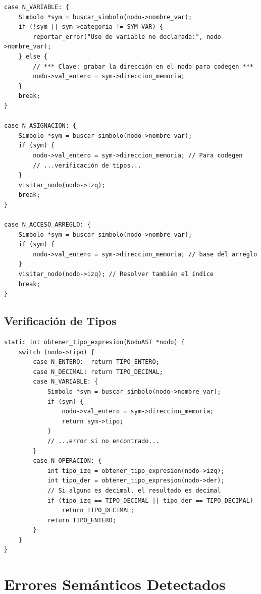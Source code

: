 \begin{lstlisting}[style=cstyle, caption={Anotación de variables en el AST}]
case N_VARIABLE: {
    Simbolo *sym = buscar_simbolo(nodo->nombre_var);
    if (!sym || sym->categoria != SYM_VAR) {
        reportar_error("Uso de variable no declarada:", nodo->nombre_var);
    } else {
        // *** Clave: grabar la dirección en el nodo para codegen ***
        nodo->val_entero = sym->direccion_memoria;
    }
    break;
}

case N_ASIGNACION: {
    Simbolo *sym = buscar_simbolo(nodo->nombre_var);
    if (sym) {
        nodo->val_entero = sym->direccion_memoria; // Para codegen
        // ...verificación de tipos...
    }
    visitar_nodo(nodo->izq);
    break;
}

case N_ACCESO_ARREGLO: {
    Simbolo *sym = buscar_simbolo(nodo->nombre_var);
    if (sym) {
        nodo->val_entero = sym->direccion_memoria; // base del arreglo
    }
    visitar_nodo(nodo->izq); // Resolver también el índice
    break;
}
\end{lstlisting}

\subsection{Verificación de Tipos}

\begin{lstlisting}[style=cstyle, caption={Verificación de tipos en expresiones}]
static int obtener_tipo_expresion(NodoAST *nodo) {
    switch (nodo->tipo) {
        case N_ENTERO:  return TIPO_ENTERO;
        case N_DECIMAL: return TIPO_DECIMAL;
        case N_VARIABLE: {
            Simbolo *sym = buscar_simbolo(nodo->nombre_var);
            if (sym) {
                nodo->val_entero = sym->direccion_memoria;
                return sym->tipo;
            }
            // ...error si no encontrado...
        }
        case N_OPERACION: {
            int tipo_izq = obtener_tipo_expresion(nodo->izq);
            int tipo_der = obtener_tipo_expresion(nodo->der);
            // Si alguno es decimal, el resultado es decimal
            if (tipo_izq == TIPO_DECIMAL || tipo_der == TIPO_DECIMAL) 
                return TIPO_DECIMAL;
            return TIPO_ENTERO;
        }
    }
}
\end{lstlisting}

\section{Errores Semánticos Detectados}

